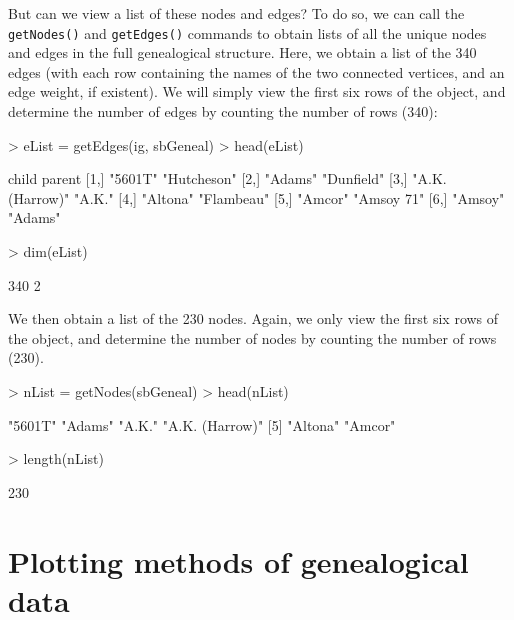 \documentclass{article}
\numberwithin{equation}{section} %
\begin{document}
But can we view a list of these nodes and edges? To do so, we can call the \texttt{getNodes()} and \texttt{getEdges()} commands to obtain lists of all the unique nodes and edges in the full genealogical structure. Here, we obtain a list of the 340 edges (with each row containing the names of the two connected vertices, and an edge weight, if existent). We will simply view the first six rows of the object, and determine the number of edges by counting the number of rows (340):

\begin{Schunk}
\begin{Sinput}
> eList = getEdges(ig, sbGeneal)
> head(eList)
\end{Sinput}
\begin{Soutput}
     child           parent     
[1,] "5601T"         "Hutcheson"
[2,] "Adams"         "Dunfield" 
[3,] "A.K. (Harrow)" "A.K."     
[4,] "Altona"        "Flambeau" 
[5,] "Amcor"         "Amsoy 71" 
[6,] "Amsoy"         "Adams"    
\end{Soutput}
\begin{Sinput}
> dim(eList)
\end{Sinput}
\begin{Soutput}
[1] 340   2
\end{Soutput}
\end{Schunk}

We then obtain a list of the 230 nodes. Again, we only view the first six rows of the object, and determine the number of nodes by counting the number of rows (230).

\begin{Schunk}
\begin{Sinput}
> nList = getNodes(sbGeneal)
> head(nList)
\end{Sinput}
\begin{Soutput}
[1] "5601T"         "Adams"         "A.K."          "A.K. (Harrow)"
[5] "Altona"        "Amcor"        
\end{Soutput}
\begin{Sinput}
> length(nList)
\end{Sinput}
\begin{Soutput}
[1] 230
\end{Soutput}
\end{Schunk}

\section{Plotting methods of genealogical data}
\end{document}
